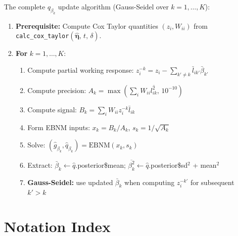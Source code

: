 \documentclass[11pt]{article}
\begin{document}
The complete $q_{\beta_k}$ update algorithm (Gauss-Seidel over $k = 1,\ldots,K$):

\begin{enumerate}
  \item \textbf{Prerequisite:} Compute Cox Taylor quantities $(z_i, W_{ii})$ from
        \texttt{calc\_cox\_taylor}$(\hat{\bm{\eta}},\, t,\, \delta)$.
  \item \textbf{For} $k = 1, \ldots, K$:
  \begin{enumerate}
    \item Compute partial working response:
          $z_i^{-k} = z_i - \sum_{k'\neq k}\bar{l}_{ik'}\bar{\beta}_{k'}$
    \item Compute precision: $A_k = \max\!\left(\sum_i W_{ii}\overline{l^2_{ik}},\,10^{-10}\right)$
    \item Compute signal: $B_k = \sum_i W_{ii} z_i^{-k} \bar{l}_{ik}$
    \item Form EBNM inputs: $x_k = B_k/A_k$, $s_k = 1/\sqrt{A_k}$
    \item Solve: $(\hat{g}_{\beta_k}, \hat{q}_{\beta_k}) = \mathrm{EBNM}(x_k, s_k)$
    \item Extract: $\bar{\beta}_k \leftarrow \hat{q}$.posterior\$mean;
          $\overline{\beta^2_k} \leftarrow \hat{q}$.posterior\$sd$^2$ + mean$^2$
    \item \textbf{Gauss-Seidel:} use updated $\bar{\beta}_k$ when computing
          $z_i^{-k'}$ for subsequent $k' > k$
  \end{enumerate}
\end{enumerate}

\appendix
\section{Notation Index}\label{app:notation}
\end{document}
